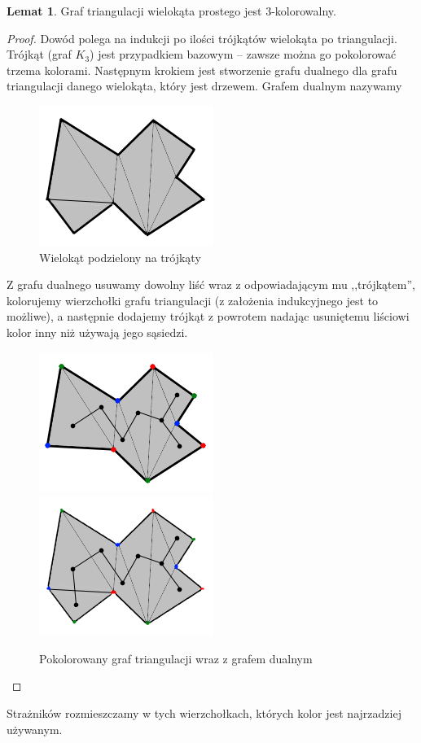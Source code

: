 \documentclass[brudnopis]{xmgr}
\theoremstyle{definition}
\newtheorem{Lemat}{Lemat}
\begin{document}
\begin{Lemat} \cite{fisk}
Graf triangulacji wielokąta prostego jest $3$-kolorowalny.
\end{Lemat}
\begin{proof}
	Dowód polega na indukcji po ilości trójkątów wielokąta po triangulacji. Trójkąt (graf $K_3$) jest przypadkiem bazowym -- zawsze można go pokolorować trzema kolorami. Następnym krokiem jest stworzenie grafu  dualnego dla grafu triangulacji danego wielokąta, który jest drzewem. Grafem dualnym nazywamy 
	\begin{figure}[ht!]
	  \centering
	  \includegraphics{rysunki/dual.png}
	    \caption{Wielokąt podzielony na trójkąty}
	\end{figure} 
	Z grafu dualnego usuwamy dowolny liść wraz z odpowiadającym mu ,,trójkątem'', kolorujemy wierzchołki grafu triangulacji (z założenia indukcyjnego jest to możliwe), a następnie dodajemy trójkąt z powrotem nadając usuniętemu liściowi kolor inny niż używają jego sąsiedzi.
  \begin{figure}[ht!]
    \centering
      \includegraphics{rysunki/dual_kolor.png} 
      \includegraphics{rysunki/dual_caly_kolor.png}
      \caption{Pokolorowany graf triangulacji wraz z grafem dualnym}
  \end{figure} 
\end{proof}
	Strażników rozmieszczamy w tych wierzchołkach, których kolor jest najrzadziej używanym.
\end{document}
